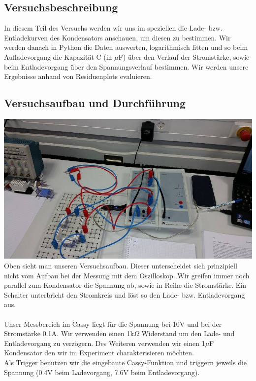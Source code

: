 \documentclass[12pt,a4paper]{article}
\begin{document}
\subsection{Versuchsbeschreibung}
In diesem Teil des Versuchs werden wir uns im speziellen die Lade- bzw. Entladekurven des Kondensators anschauen, um diesen zu bestimmen. Wir werden danach in Python die Daten auswerten, logarithmisch fitten und so beim Aufladevorgang die Kapazität C (in $\mu$F) über den Verlauf der Stromstärke, sowie beim Entladevorgang über den Spannungsverlauf bestimmen. Wir werden unsere Ergebnisse anhand von Residuenplots evaluieren.\\
\subsection{Versuchsaufbau und Durchführung}
\includegraphics[scale=0.35]{12834837_1207198225971904_686312351_n.jpg}
\\Oben sieht man unseren Versuchsaufbau. Dieser unterscheidet sich prinzipiell nicht vom Aufbau bei der Messung mit dem Oszilloskop. Wir greifen immer noch parallel zum Kondensator die Spannung ab, sowie in Reihe die Stromstärke. Ein Schalter unterbricht den Stromkreis und löst so den Lade- bzw. Entladevorgang aus.\\
\\Unser Messbereich im Cassy liegt für die Spannung bei 10V und bei der Stromstärke 0.1A. Wir verwenden einen 1k$\Omega$ Widerstand um den Lade- und Entladevorgang zu verzögern. Des Weiteren verwenden wir einen 1$\mu$F Kondensator den wir im Experiment charakterisieren möchten.\\
Als Trigger benutzen wir die eingebaute Cassy-Funktion und triggern jeweils die Spannung (0.4V beim Ladevorgang, 7.6V beim Entladevorgang).\\
\end{document}
